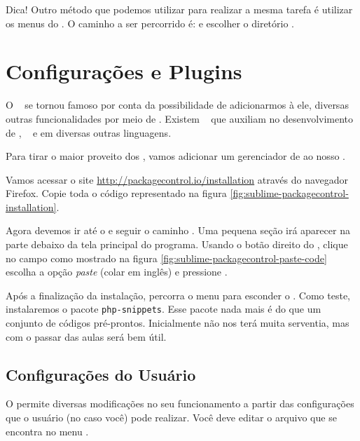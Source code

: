 Dica! Outro método que podemos utilizar para realizar a mesma tarefa é utilizar
os menus do \sublime. O caminho a ser percorrido é: 
e escolher o diretório .

\section{Configurações e Plugins}
\label{configuracoes-e-plugins}

O \sublime~ se tornou famoso por conta da possibilidade de adicionarmos à ele,
diversas outras funcionalidades por meio de \plugins. Existem \plugins~ que auxiliam
no desenvolvimento de \html, \css~ e em diversas outras linguagens.

Para tirar o maior proveito dos \plugins, vamos adicionar um gerenciador de
\plugins ao nosso \sublime.

Vamos acessar o site \url{http://packagecontrol.io/installation} através do navegador 
Firefox. Copie toda o código representado na figura \ref{fig:sublime-packagecontrol-installation}.

Agora devemos ir até o \sublime e seguir o caminho .
Uma pequena seção irá aparecer na parte debaixo da tela principal do programa.
Usando o botão direito do \mouse, clique no campo como mostrado na figura 
\ref{fig:sublime-packagecontrol-paste-code} escolha a opção \textit{paste} (colar em inglês)
e pressione \avancar.


Após a finalização da instalação, percorra o menu  para
esconder o \terminal. Como teste, instalaremos o pacote \texttt{php-snippets}. Esse
pacote nada mais é do que um conjunto de códigos pré-prontos. Inicialmente não
nos terá muita serventia, mas com o passar das aulas será bem útil.

\subsection{Configurações do Usuário}
\label{configuracoes-do-usuario}

O \sublime permite diversas modificações no seu funcionamento a partir das configurações
que o usuário (no caso você) pode realizar. Você deve editar o arquivo 
que se encontra no menu .

